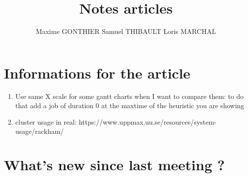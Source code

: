 \documentclass[a4paper]{article}
\title{Notes articles}
\author{Maxime GONTHIER Samuel THIBAULT Loris MARCHAL}
\begin{document}
\newpage


\section{Informations for the article}
	\begin{enumerate}
		\item Use same X scale for some gantt charts when I want to compare them: to do that add a job of duration 0 at the maxtime of the heuristic you are showing
		\item cluster usage in real: https://www.uppmax.uu.se/resources/system-usage/rackham/
	 \end{enumerate}

\section{What's new since last meeting ?}
\end{document}
